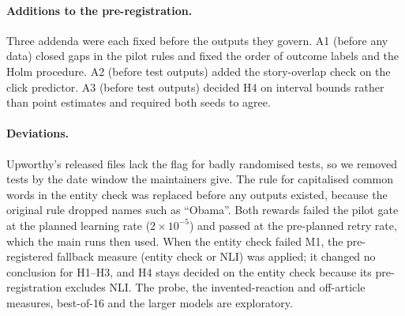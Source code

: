 \paragraph{Additions to the pre-registration.} Three addenda were each fixed before the outputs they govern. A1 (before any data) closed gaps in the pilot rules and fixed the order of outcome labels and the Holm procedure. A2 (before test outputs) added the story-overlap check on the click predictor. A3 (before test outputs) decided H4 on interval bounds rather than point estimates and required both seeds to agree.

\paragraph{Deviations.} Upworthy's released files lack the flag for badly randomised tests, so we removed tests by the date window the maintainers give. The rule for capitalised common words in the entity check was replaced before any outputs existed, because the original rule dropped names such as ``Obama''. Both rewards failed the pilot gate at the planned learning rate ($2\times10^{-5}$) and passed at the pre-planned retry rate, which the main runs then used. When the entity check failed M1, the pre-registered fallback measure (entity check or NLI) was applied; it changed no conclusion for H1--H3, and H4 stays decided on the entity check because its pre-registration excludes NLI. The probe, the invented-reaction and off-article measures, best-of-16 and the larger models are exploratory.

